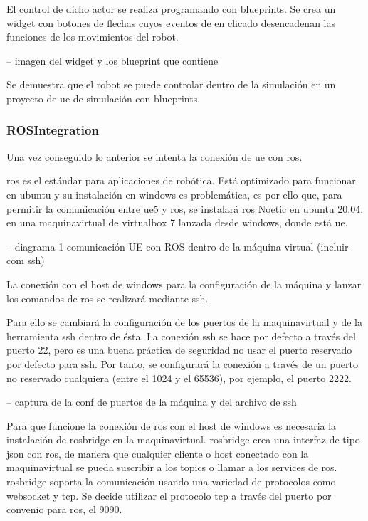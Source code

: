 \documentclass[a4paper, 12pt, spanish, twoside]{article}
\begin{document}
El control de dicho \gls{actor} se realiza programando con \glspl{blueprint}. Se crea un \gls{widget} con botones de flechas cuyos eventos de en clicado desencadenan las funciones de los movimientos del robot.  

-- imagen del widget y los blueprint que contiene 

Se demuestra que el robot se puede controlar dentro de la simulación en un proyecto de \acrshort{ue} de simulación con \glspl{blueprint}. 

\subsubsection{ROSIntegration} \label{sec:implementacion:nerfstudio-volinga:rosintegration}

Una vez conseguido lo anterior se intenta la conexión de \acrshort{ue} con \acrshort{ros}.  

\acrshort{ros} es el estándar para aplicaciones de robótica. Está optimizado para funcionar en \gls{ubuntu} y su instalación en \gls{windows} es problemática, es por ello que, para permitir la comunicación entre \acrshort{ue}5 y \acrshort{ros}, se instalará \acrshort{ros} Noetic en \gls{ubuntu} 20.04. en una \gls{maquinavirtual} de \gls{virtualbox} 7 lanzada desde \gls{windows}, donde está \acrshort{ue}.  

-- diagrama 1 comunicación UE con ROS dentro de la máquina virtual (incluir com ssh) 

La conexión con el \gls{host} de \gls{windows} para la configuración de la máquina y lanzar los comandos de \acrshort{ros} se realizará mediante \acrshort{ssh}.  

Para ello se cambiará la configuración de los \glspl{puerto} de la \gls{maquinavirtual} y de la herramienta \acrshort{ssh} dentro de ésta. La conexión \acrshort{ssh} se hace por defecto a través del \gls{puerto} 22, pero es una buena práctica de seguridad no usar el \gls{puerto} reservado por defecto para \acrshort{ssh}. Por tanto, se configurará la conexión a través de un \gls{puerto} no reservado cualquiera (entre el 1024 y el 65536), por ejemplo, el \gls{puerto} 2222. 

-- captura de la conf de puertos de la máquina y del archivo de ssh 

Para que funcione la conexión de \acrshort{ros} con el \gls{host} de \gls{windows} es necesaria la instalación de \gls{rosbridge} en la \gls{maquinavirtual}. \gls{rosbridge} crea una interfaz de tipo \acrshort{json} con \acrshort{ros}, de manera que cualquier \gls{cliente} o \gls{host} conectado con la \gls{maquinavirtual} se pueda suscribir a los \glspl{topic} o llamar a los \glspl{service} de \acrshort{ros}. \gls{rosbridge} soporta la comunicación usando una variedad de protocolos como \gls{websocket} y \acrshort{tcp}. Se decide utilizar el protocolo \acrshort{tcp} a través del \gls{puerto} por convenio para \acrshort{ros}, el 9090. 
\end{document}
